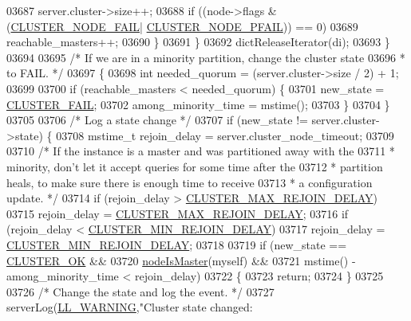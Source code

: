 \begin{DoxyCode}
{{{{{{{{{{{{{{{{{{{{{{{{{{{{{{{{{{{{{{{{{{{{{{{{{{{{{{{{{{{{{03687                 server.cluster->size++;
03688                 \textcolor{keywordflow}{if} ((node->flags & (\hyperlink{cluster_8h_ad211e85c7baf8a5a59acd747e4e9005a}{CLUSTER\_NODE\_FAIL}|
      \hyperlink{cluster_8h_a5306c1ae8988b8be0a1a02bd9162dfa1}{CLUSTER\_NODE\_PFAIL})) == 0)
03689                     reachable\_masters++;
03690             \}
03691         \}
03692         dictReleaseIterator(di);
03693     \}
03694 
03695     \textcolor{comment}{/* If we are in a minority partition, change the cluster state}
03696 \textcolor{comment}{     * to FAIL. */}
03697     \{
03698         \textcolor{keywordtype}{int} needed\_quorum = (server.cluster->size / 2) + 1;
03699 
03700         \textcolor{keywordflow}{if} (reachable\_masters < needed\_quorum) \{
03701             new\_state = \hyperlink{cluster_8h_a4a46e6d5b85c594d08283dc6da2a32bf}{CLUSTER\_FAIL};
03702             among\_minority\_time = mstime();
03703         \}
03704     \}
03705 
03706     \textcolor{comment}{/* Log a state change */}
03707     \textcolor{keywordflow}{if} (new\_state != server.cluster->state) \{
03708         mstime\_t rejoin\_delay = server.cluster\_node\_timeout;
03709 
03710         \textcolor{comment}{/* If the instance is a master and was partitioned away with the}
03711 \textcolor{comment}{         * minority, don't let it accept queries for some time after the}
03712 \textcolor{comment}{         * partition heals, to make sure there is enough time to receive}
03713 \textcolor{comment}{         * a configuration update. */}
03714         \textcolor{keywordflow}{if} (rejoin\_delay > \hyperlink{cluster_8c_adb83a5ca7312d0554348246a2d240bae}{CLUSTER\_MAX\_REJOIN\_DELAY})
03715             rejoin\_delay = \hyperlink{cluster_8c_adb83a5ca7312d0554348246a2d240bae}{CLUSTER\_MAX\_REJOIN\_DELAY};
03716         \textcolor{keywordflow}{if} (rejoin\_delay < \hyperlink{cluster_8c_a215c4f74aaedd23cc5c82ea52548eb44}{CLUSTER\_MIN\_REJOIN\_DELAY})
03717             rejoin\_delay = \hyperlink{cluster_8c_a215c4f74aaedd23cc5c82ea52548eb44}{CLUSTER\_MIN\_REJOIN\_DELAY};
03718 
03719         \textcolor{keywordflow}{if} (new\_state == \hyperlink{cluster_8h_adbda03922c45cac3cfc98a5c34a9d2d2}{CLUSTER\_OK} &&
03720             \hyperlink{cluster_8h_a2d8e84269474d8750565fb3fb67aa436}{nodeIsMaster}(myself) &&
03721             mstime() - among\_minority\_time < rejoin\_delay)
03722         \{
03723             \textcolor{keywordflow}{return};
03724         \}
03725 
03726         \textcolor{comment}{/* Change the state and log the event. */}
03727         serverLog(\hyperlink{server_8h_a31229b9334bba7d6be2a72970967a14b}{LL\_WARNING},\textcolor{stringliteral}{"Cluster state changed: %
}}}}}}}}}}}}}}}}}}}}}}}}}}}}}}}}}}}}}}}}}}}}}}}}}}}}}}}}}}}}}}
\end{DoxyCode}
